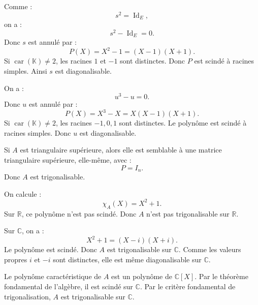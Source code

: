 \documentclass[11pt,a4paper]{article}
\newcommand{\K}{\mathbb K}
\newcommand{\R}{\mathbb R}
\newcommand{\C}{\mathbb C}
\newcommand{\Id}{\operatorname{Id}}
\begin{document}
\begin{correctionbox}[6]
Comme :
\[
s^2=\Id_E,
\]
on a :
\[
s^2-\Id_E=0.
\]
Donc \(s\) est annulé par :
\[
P(X)=X^2-1=(X-1)(X+1).
\]
Si \(\operatorname{car}(\K)\neq2\), les racines \(1\) et \(-1\) sont distinctes.  
Donc \(P\) est scindé à racines simples.  
Ainsi \(s\) est diagonalisable.
\end{correctionbox}

\begin{correctionbox}[7]
On a :
\[
u^3-u=0.
\]
Donc \(u\) est annulé par :
\[
P(X)=X^3-X=X(X-1)(X+1).
\]
Si \(\operatorname{car}(\K)\neq2\), les racines \(-1,0,1\) sont distinctes.  
Le polynôme est scindé à racines simples.  
Donc \(u\) est diagonalisable.
\end{correctionbox}

\begin{correctionbox}[8]
Si \(A\) est triangulaire supérieure, alors elle est semblable à une matrice triangulaire supérieure, elle-même, avec :
\[
P=I_n.
\]
Donc \(A\) est trigonalisable.
\end{correctionbox}

\begin{correctionbox}[9]
On calcule :
\[
\chi_A(X)=X^2+1.
\]
Sur \(\R\), ce polynôme n'est pas scindé.  
Donc \(A\) n'est pas trigonalisable sur \(\R\).

Sur \(\C\), on a :
\[
X^2+1=(X-i)(X+i).
\]
Le polynôme est scindé.  
Donc \(A\) est trigonalisable sur \(\C\).  
Comme les valeurs propres \(i\) et \(-i\) sont distinctes, elle est même diagonalisable sur \(\C\).
\end{correctionbox}

\begin{correctionbox}[10]
Le polynôme caractéristique de \(A\) est un polynôme de \(\C[X]\).  
Par le théorème fondamental de l'algèbre, il est scindé sur \(\C\).  
Par le critère fondamental de trigonalisation, \(A\) est trigonalisable sur \(\C\).
\end{correctionbox}
\end{document}
